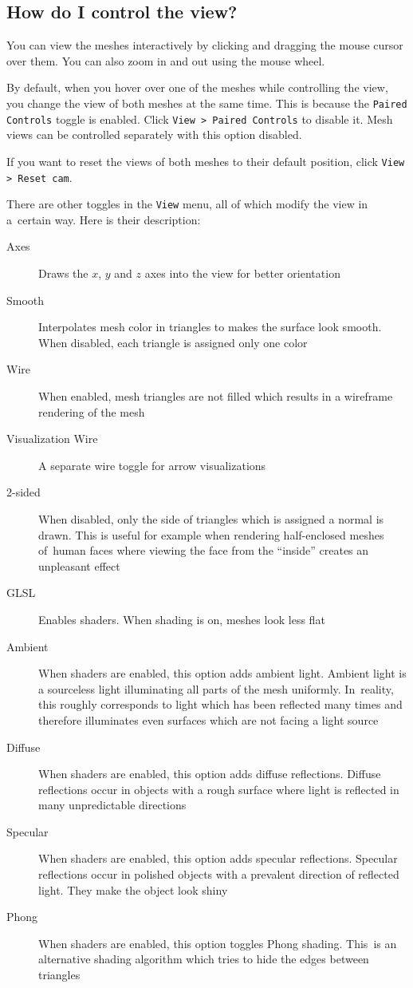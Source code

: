 \subsection{How do I control the view?}
\label{attch:user_doc-view_control}

You can view the meshes interactively by clicking and dragging the mouse cursor over them. You can also zoom in and out using the mouse wheel.

By default, when you hover over one of the meshes while controlling the view, you change the view of both meshes at the same time. This is because the \verb+Paired Controls+ toggle is enabled. Click \verb+View > Paired Controls+ to disable it. Mesh views can be controlled separately with this option disabled.

If you want to reset the views of both meshes to their default position, click \verb+View > Reset cam+.

There are other toggles in the \verb+View+ menu, all of which modify the view in a~certain way. Here is their description:

\begin{description}
\item [Axes] Draws the \(x\), \(y\) and \(z\) axes into the view for better orientation
\item [Smooth] Interpolates mesh color in triangles to makes the surface look smooth. When disabled, each triangle is assigned only one color
\item [Wire] When enabled, mesh triangles are not filled which results in a wireframe rendering of the mesh
\item [Visualization Wire] A separate wire toggle for arrow visualizations
\item [2-sided] When disabled, only the side of triangles which is assigned a normal is drawn. This is useful for example when rendering half-enclosed meshes of~human faces where viewing the face from the ``inside'' creates an unpleasant effect
\item [GLSL] Enables shaders. When shading is on, meshes look less flat
\item [Ambient] When shaders are enabled, this option adds ambient light. Ambient light is a sourceless light illuminating all parts of the mesh uniformly. In~reality, this roughly corresponds to light which has been reflected many times and therefore illuminates even surfaces which are not facing a light source 
\item [Diffuse] When shaders are enabled, this option adds diffuse reflections. Diffuse reflections occur in objects with a rough surface where light is reflected in many unpredictable directions
\item [Specular] When shaders are enabled, this option adds specular reflections. Specular reflections occur in polished objects with a prevalent direction of reflected light. They make the object look shiny
\item [Phong] When shaders are enabled, this option toggles Phong shading. This~is an alternative shading algorithm which tries to hide the edges between triangles
\end{description}

